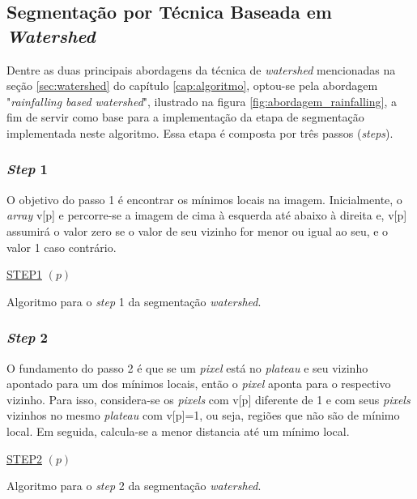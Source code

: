 \subsection{Segmentação por Técnica Baseada em \textit{Watershed}}
Dentre as duas principais abordagens da técnica de \textit{watershed} mencionadas na seção \ref{sec:watershed} do capítulo \ref{cap:algoritmo}, optou-se pela abordagem "\textit{rainfalling based watershed}", ilustrado na figura \ref{fig:abordagem_rainfalling}, a fim de servir como base para a implementação da etapa de segmentação implementada neste algoritmo. Essa etapa é composta por três passos (\textit{steps}). 

\subsubsection{\textit{Step} 1}
O objetivo do passo 1 é encontrar os mínimos locais na imagem. Inicialmente, o \textit{array} v[p] e percorre-se a imagem de cima à esquerda até abaixo à direita e, v[p] assumirá o valor zero se o valor de seu vizinho for menor ou igual ao seu, e o valor 1 caso contrário.


\begin{algorithm}[H]
\SetAlgoLined


    \underline{STEP1} $(p)$\;
 
\caption{Algoritmo para o \textit{step} 1 da segmentação \textit{watershed}. \cite{ruparelia2012implementation}}
\end{algorithm}

\subsubsection{\textit{Step} 2} 
O fundamento do passo 2 é que se um \textit{pixel} está no \textit{plateau} e seu vizinho apontado para um dos mínimos locais, então o \textit{pixel} aponta para o respectivo vizinho. Para isso, considera-se os \textit{pixels} com v[p] diferente de 1 e com seus \textit{pixels} vizinhos no mesmo \textit{plateau} com v[p]=1, ou seja, regiões que não são de mínimo local. Em seguida, calcula-se a menor distancia até um mínimo local.

\begin{algorithm}[H]
\SetAlgoLined


    \underline{STEP2} $(p)$\;
		
 
\caption{Algoritmo para o \textit{step} 2 da segmentação \textit{watershed}. \cite{ruparelia2012implementation}}
\end{algorithm}


